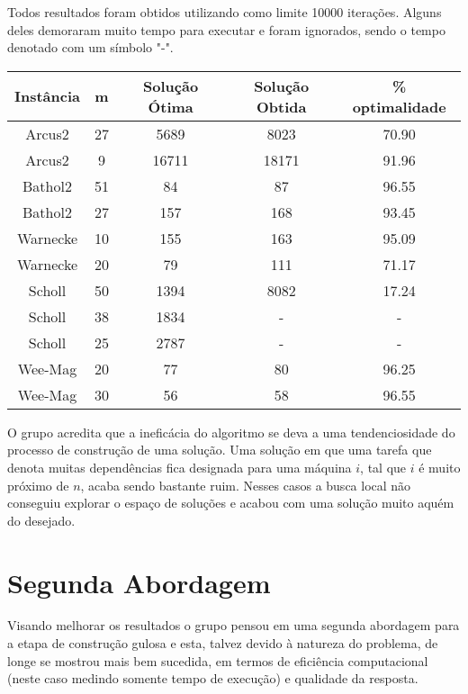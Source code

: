 \documentclass{report}
\begin{document}
{Todos resultados foram obtidos utilizando como limite 10000 iterações. Alguns deles
demoraram muito tempo para executar e foram ignorados, sendo o tempo denotado com
um símbolo "-".

\begin{table}[htbp]
 \begin{tabular}{|c|c|c|c|c|}
  \hline
  \textbf{Instância} & \textbf{m} & \textbf{Solução Ótima} & \textbf{Solução Obtida} & \% optimalidade \\
  \hline
  Arcus2 & 27 & 5689 & 8023 & 70.90 \\
  \hline
  Arcus2 & 9 & 16711 & 18171 & 91.96 \\
  \hline
  Bathol2 & 51 & 84 & 87 & 96.55 \\
  \hline
  Bathol2 & 27 & 157 & 168 & 93.45 \\
  \hline
  Warnecke & 10 & 155 & 163 & 95.09 \\
  \hline
  Warnecke & 20 & 79 & 111 & 71.17 \\
  \hline
  Scholl & 50 & 1394 & 8082 & 17.24 \\
  \hline
  Scholl & 38 & 1834 & - & - \\
  \hline
  Scholl & 25 & 2787 & - & - \\
  \hline
  Wee-Mag & 20 & 77 & 80 & 96.25 \\
  \hline
  Wee-Mag & 30 & 56 & 58 & 96.55 \\
  \hline
 \end{tabular}
\end{table}

O grupo acredita que a ineficácia do algoritmo se deva a uma tendenciosidade do
processo de construção de uma solução. Uma solução em que uma tarefa que denota
muitas dependências fica designada para uma máquina $i$, tal que $i$ é muito
próximo de $n$, acaba sendo bastante ruim. Nesses casos a busca local não
conseguiu explorar o espaço de soluções e acabou com uma solução muito aquém
do desejado.

\section{Segunda Abordagem}

Visando melhorar os resultados o grupo pensou em uma segunda abordagem para a
etapa de construção gulosa e esta, talvez devido à natureza do problema,
de longe se mostrou  mais bem sucedida, em termos de
eficiência computacional (neste caso medindo
somente tempo de execução) e qualidade da resposta.

}
\end{document}

